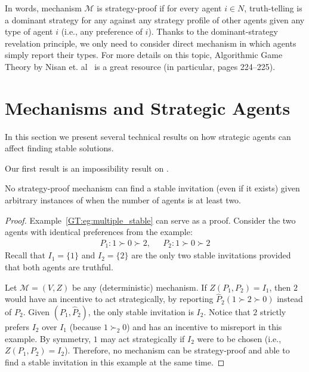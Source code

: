 In words, mechanism $\mathcal{M}$ is strategy-proof if for every agent $i\in N$, truth-telling is a dominant strategy for any against any strategy profile of other agents given any type of agent $i$ (i.e., any preference of $i$). Thanks to the dominant-strategy revelation principle, we only need to consider direct mechanism in which agents simply report their types. For more details on this topic, Algorithmic Game Theory by Nisan et. al~\cite{nisan2007algorithmic} is a great resource (in particular, pages 224--225).





\section{Mechanisms and Strategic Agents} \label{GT:sec:Mechanism}
In this section we present several technical results on how strategic agents can affect finding stable solutions.

Our first result is an impossibility result on \AOIP.

\begin{theorem} \label{GT:thm:impossibility}
No strategy-proof mechanism can find a stable invitation (even if it exists) given arbitrary instances of \AOIPs when the number of agents is at least two.
\end{theorem}
\begin{proof}
Example~\ref{GT:eg:multiple_stable} can serve as a proof. Consider the two agents with identical preferences from the example:
	\begin{equation*}
		\begin{aligned}
				P_1: 1 \succ 0 \succ 2,~~~& P_2: 1 \succ 0 \succ 2
		\end{aligned}
	\end{equation*}
	Recall that $I_1 = \{1\}$ and $I_2 =\{2\}$ are the only two stable invitations provided that both agents are truthful.

	Let $\mathcal{M} = (V, Z)$ be any (deterministic) mechanism.
	If $Z(P_1, P_2) = I_1$, then $2$ would have an incentive to act strategically, by reporting $\hat{P}_2 (1 \succ 2 \succ 0)$ instead of $P_2$. 
	Given $(P_1, \hat{P}_2)$, the only stable invitation is $I_2$.
	Notice that $2$ strictly prefers $I_2$ over $I_1$ (because $1 \succ_2 0$) and has an incentive to misreport in this example. By symmetry, $1$ may act strategically if $I_2$ were to be chosen (i.e., $Z(P_1, P_2) = I_2$).
	Therefore, no mechanism can be strategy-proof and able to find a stable invitation in this example at the same time.
\end{proof}

